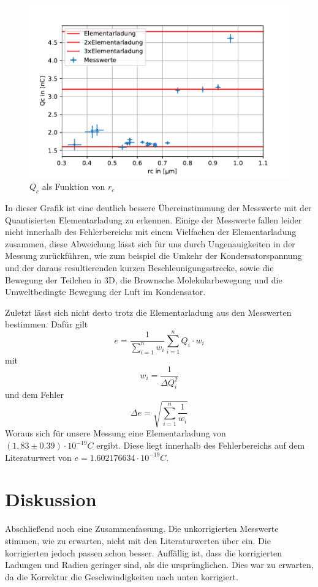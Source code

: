 \documentclass{scrartcl}
\begin{document}
	\begin{figure}[H]
		\centering
		\includegraphics[width=1.0\textwidth]{QoverRUncorrCunt.pdf}
		\caption{$Q_c$ als Funktion von $r_c$}
	\end{figure}
	In dieser Grafik ist eine deutlich bessere Übereinstimmung der Messwerte mit der Quantisierten Elementarladung zu
	erkennen. Einige der Messwerte fallen leider nicht innerhalb des Fehlerbereichs mit einem Vielfachen der Elementarladung
	zusammen, diese Abweichung lässt sich für uns durch Ungenauigkeiten in der Messung zurückführen, wie zum beispiel
	die Umkehr der Kondersatorspannung und der daraus resultierenden kurzen Beschleunigungsstrecke, sowie die Bewegung der
	Teilchen in 3D, die Brownsche Molekularbewegung und die Umweltbedingte Bewegung der Luft im Kondensator.
	
	Zuletzt lässt sich nicht desto trotz die Elementarladung aus den Messwerten bestimmen. Dafür gilt
	\begin{equation}
		e = \frac{1}{\sum_{i=1}^n w_i} \sum_{i=1}^n Q_i \cdot w_i
	\end{equation}
	mit 
	\begin{equation}
		w_i = \frac{1}{\Delta Q_i^2}
	\end{equation}
	und dem Fehler
	\begin{equation}
		\Delta e = \sqrt{\sum_{i=1}^n\frac{1}{w_i}}
	\end{equation}
	Woraus sich für unsere Messung eine Elementarladung von $(1,83\pm 0.39)\cdot 10^{-19} C$ ergibt.
	Diese liegt innerhalb des Fehlerbereichs auf dem Literaturwert von $e=1.602176634\cdot 10^{-19}C$.
\section{Diskussion}
	Abschließend noch eine Zusammenfassung. Die unkorrigierten Messwerte stimmen, wie zu erwarten, 
	nicht mit den Literaturwerten über ein. Die korrigierten jedoch passen schon besser. 
	Auffällig ist, dass die korrigierten Ladungen und Radien geringer sind, als die ursprünglichen. 
	Dies war zu erwarten, da die Korrektur die Geschwindigkeiten nach unten korrigiert. 
\end{document}
